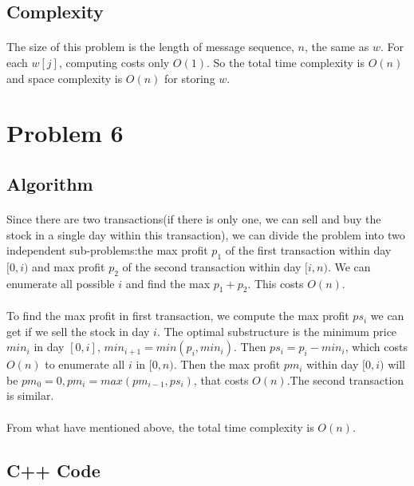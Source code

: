 \documentclass[]{article}
\begin{document}
        \subsection{Complexity}
            \paragraph{}The size of this problem is the length of message sequence, $n$, the same as $w$. For each $w[j]$, computing costs only $O(1)$. So the total time complexity is $O(n)$ and space complexity is $O(n)$ for storing $w$.
    
    \section{Problem 6}
        \subsection{Algorithm}
            \paragraph{}Since there are two transactions(if there is only one, we can sell and buy the stock in a single day within this transaction), we can divide the problem into two independent sub-problems:the max profit $p_1$ of the first transaction within day $[0,i)$ and max profit $p_2$ of the second transaction within day $[i,n)$. We can enumerate all possible $i$ and find the max $p_1+p_2$. This costs $O(n)$.
            \paragraph{}To find the max profit in first transaction, we compute the max profit $ps_i$ we can get if we sell the stock in day $i$. The optimal substructure is the minimum price $min_i$ in day $[0,i]$, $min_{i+1} = min(p_i,min_i)$. Then $ps_i=p_i-min_i$, which costs $O(n)$ to enumerate all $i$ in $[0,n)$. Then the max profit $pm_i$ within day $[0,i)$ will be $pm_0 = 0,pm_i = max(pm_{i-1},ps_i)$, that costs $O(n)$.The second transaction is similar.
            \paragraph{}From what have mentioned above, the total time complexity is $O(n)$.
        \subsection{C++ Code}
            
    
    
\end{document}
